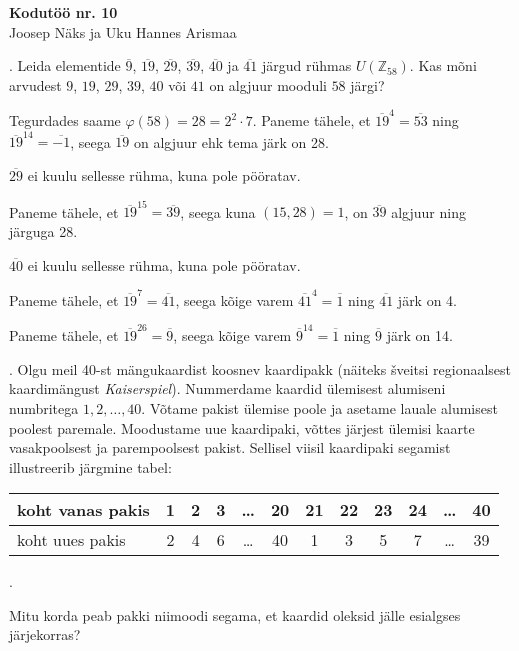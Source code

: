 \documentclass[a4paper, 10pt]{article}
\newcommand{\Z}{\mathbb{Z}}
\newcommand{\w}{\overline}
\begin{document}
\begin{center}
\Large\textbf{Kodutöö nr. 10}\\
\small{Joosep Näks ja Uku Hannes Arismaa}
\end{center}

\bigskip

. Leida elementide $\overline {9}$, $\overline{19}$, $\overline{29}$, $\overline{39}$, $\overline{40}$ ja $\overline{41}$ j\"argud r\"uhmas $U(\Z_{58})$. Kas m\~oni arvudest $9$, $19$, $29$, $39$, $40$ või $41$ on algjuur mooduli $58$ j\"argi?

\bigskip

Tegurdades saame $\varphi(58)=28=2^2\cdot7$. Paneme tähele, et $\w{19}^{4}=\w{53}$ ning $\w{19}^{14}=\w{-1}$, seega $\w{19}$ on algjuur ehk tema järk on 28.


$\w{29}$ ei kuulu sellesse rühma, kuna pole pööratav.

Paneme tähele, et $\w{19}^{15}=\w{39}$, seega kuna $(15,28)=1$, on $\w{39}$ algjuur ning järguga 28.

$\w{40}$ ei kuulu sellesse rühma, kuna pole pööratav.

Paneme tähele, et $\w{19}^{7}=\w{41}$, seega kõige varem $\w{41}^{4}=\w{1}$ ning $\w{41}$ järk on 4. 

Paneme tähele, et $\w{19}^{26}=\w{9}$, seega kõige varem $\w{9}^{14}=\w{1}$ ning $\w{9}$ järk on 14.

\bigskip

. Olgu meil 40-st m\"angukaardist koosnev kaardipakk (näiteks \v{s}veitsi regionaalsest kaardimängust \emph{Kaiserspiel}). 
Nummerdame kaardid \"ulemi\-se\-st alumiseni numbritega $1,2,\ldots,40$. 
V\~otame pakist \"ulemise poole ja asetame lauale alumisest 
poolest paremale. Moodustame uue kaardipaki, v\~ottes j\"arjest 
ülemisi kaarte vasakpoolsest ja parempoolsest pakist. Sellisel 
viisil kaardipaki segamist illustreerib j\"argmine tabel:
\begin{center}
\begin{tabular}{|l|c|c|c|c|c|c|c|c|c|c|c|}
\hline
koht vanas pakis & 1 & 2 & 3 & \ldots & 20 & 21 & 22 & 23 & 
24 & \ldots & 40 \\ \hline
koht uues pakis & 2 & 4 & 6 & \ldots & 40 & 1 & 3 & 5 & 
7 & \ldots & 39 \\ \hline
\end{tabular}.
\end{center}
Mitu korda peab pakki niimoodi segama, et kaardid oleksid 
j\"alle esialgses j\"arjekorras? 
\end{document}
